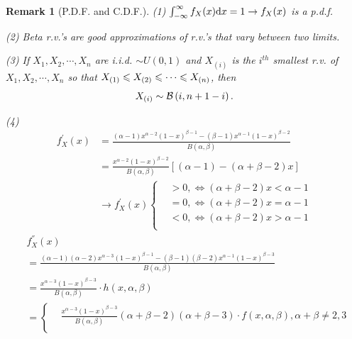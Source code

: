 \documentclass[openany,12pt]{book}
\newtheorem{remark}{Remark}[chapter]
\begin{document}
\begin{remark}[P.D.F. and C.D.F.]
  (1) $\int_{-\infty}^{\infty}{f_X(x)\mathrm{d} x}=1 \to f_X(x)$ is a p.d.f.

  (2) Beta r.v.'s are good approximations of r.v.'s that vary between two limits.

  (3) If $X_1,X_2, \cdots,X_n$ are i.i.d. $\sim U(0,1)$ and ${X}_{(i)}$ is the $i^{th}$ smallest r.v. of $X_1,X_2, \cdots,X_n$ so that $X_{(1)}\leqslant{X}_{(2)}\leqslant\cdots\leqslant X_{(n)}$, then
  $$
    {X}_{(i)}\sim\mathcal{B}\left(i,n+1-i\right).
  $$

  (4)
  $$\begin{aligned}
      f_{X}^{'}(x) & = \frac{\left( \alpha - 1 \right)x^{\alpha - 2}\left( 1 - x \right)^{\beta - 1} - (\beta - 1)x^{\alpha - 1}{(1 - x)}^{\beta - 2}}{B(\alpha,\beta)} \\
                   & = \frac{x^{\alpha - 2}{(1 - x)}^{\beta - 2}}{B(\alpha,\beta)}\left[ \left( \alpha - 1 \right) - \left( \alpha + \beta - 2 \right)x \right]         \\
                   & \to f_{X}^{'}(x)\left\{ \begin{aligned}
         & > 0, \Leftrightarrow \left( \alpha + \beta - 2 \right)x < \alpha - 1 \\
         & = 0, \Leftrightarrow \left( \alpha + \beta - 2 \right)x = \alpha - 1 \\
         & < 0, \Leftrightarrow \left( \alpha + \beta - 2 \right)x > \alpha - 1 \\
      \end{aligned} \right.
    \end{aligned}$$
  $$\begin{aligned}
       & f_{X}^{''}(x)                                                                                                                                                                          \\
       & = \frac{\left( \alpha - 1 \right)\left( \alpha - 2 \right)x^{\alpha - 3}\left( 1 - x \right)^{\beta - 1} - (\beta - 1)(\beta - 2)x^{\alpha - 1}{(1 - x)}^{\beta - 3}}{B(\alpha,\beta)} \\
       & = \frac{x^{\alpha - 3}{(1 - x)}^{\beta - 3}}{B(\alpha,\beta)}\cdot h(x,\alpha,\beta)                                                                                                   \\
       & = \left\{ \begin{aligned}
         & \frac{x^{\alpha - 3}\left( 1 - x \right)^{\beta - 3}}{B(\alpha,\beta)}\left( \alpha + \beta - 2 \right)\left( \alpha + \beta - 3 \right)\cdot f(x,\alpha,\beta),\alpha + \beta \neq 2,3 \\

\end{aligned}
\end{aligned}$$
\end{remark}
\end{document}

